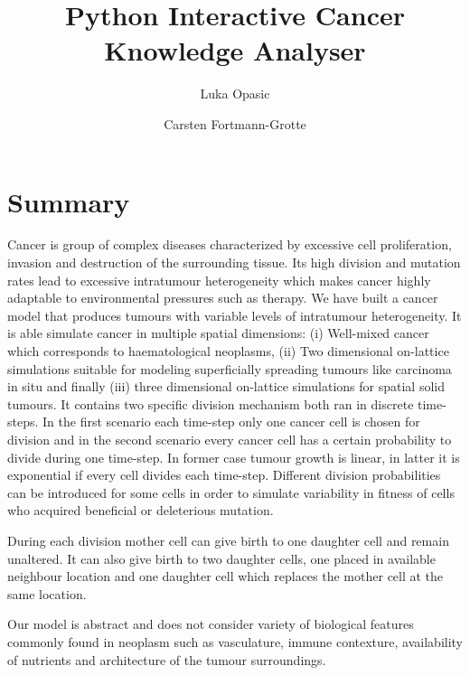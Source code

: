 \documentclass[11pt,a4paper]{article}
\begin{document}
\title{Python Interactive Cancer Knowledge Analyser}

\author[1]{Luka Opasic}
\author[1]{Carsten Fortmann-Grotte}


\date{}
\maketitle


\section*{Summary}

Cancer is group of complex diseases characterized by excessive cell proliferation, invasion and destruction of the surrounding tissue. 
Its high division and mutation rates lead to excessive intratumour heterogeneity which makes cancer highly adaptable to environmental pressures such as therapy. 
We have built a cancer model that produces tumours with variable levels of intratumour heterogeneity. 
It is able simulate cancer in multiple spatial dimensions:
(i) Well-mixed cancer which corresponds to haematological neoplasms, 
(ii) Two dimensional on-lattice simulations suitable for modeling superficially spreading tumours like carcinoma in situ and finally
(iii) three dimensional on-lattice simulations for spatial solid tumours. 
It contains two specific division mechanism both ran in discrete time-steps. In the first scenario each time-step only one cancer cell is chosen for division and in the second scenario every cancer cell has a certain probability to divide during one time-step. 
In former case tumour growth is linear, in latter it is exponential if every cell divides each time-step. 
Different division probabilities can be introduced for some cells in order to simulate variability in fitness of cells who acquired beneficial or deleterious mutation.   

During each division mother cell can give birth to one daughter cell and remain unaltered. 
It can also give birth to two daughter cells, one placed in available neighbour location and one daughter cell which replaces the mother cell at the same location.


Our model is abstract and does not consider variety of biological features commonly found in neoplasm such as vasculature, immune contexture, availability of nutrients and architecture of the tumour surroundings. 
\end{document}
